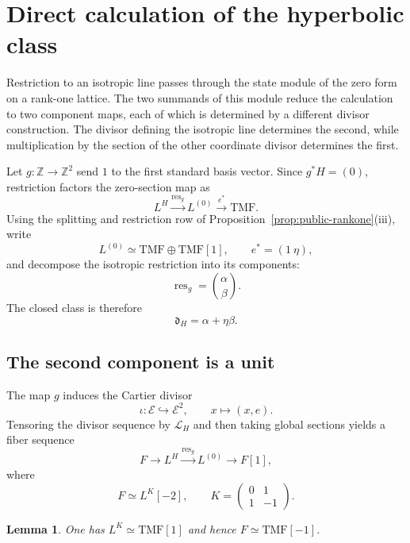 \documentclass[11pt,a4paper]{amsart}
\newcommand{\Z}{\mathbb Z}
\newcommand{\TMF}{\mathrm{TMF}}
\newcommand{\cE}{\mathcal E}
\newcommand{\cL}{\mathcal L}
\newcommand{\res}{\operatorname{res}}
\newcommand{\dclass}{\mathfrak d}
\theoremstyle{plain}
\newtheorem{lemma}[theorem]{Lemma}
\theoremstyle{definition}
\theoremstyle{remark}
\begin{document}
\section{Direct calculation of the hyperbolic class}\label{sec:H-class}

Restriction to an isotropic line passes through the state module
of the zero form on a rank-one lattice. The two summands of this
module reduce the calculation to two component maps, each of
which is determined by a different divisor construction. The
divisor defining the isotropic line determines the second,
while multiplication by the section of the other coordinate
divisor determines the first.

Let $g:\Z\to\Z^2$ send $1$ to the first standard basis vector.
Since $g^*H=(0)$, restriction factors the zero-section map as
\begin{equation}\label{eq:isotropic-factor}
 L^H\xrightarrow{\res_g}L^{(0)}\xrightarrow{e^*}\TMF.
\end{equation}
Using the splitting and restriction row of
Proposition~\ref{prop:public-rankone}(iii), write
\[
 L^{(0)}\simeq\TMF\oplus\TMF[1],
 \qquad
 e^*=(1\ \eta),
\]
and decompose the isotropic restriction into its components:
\begin{equation}\label{eq:alpha-beta}
 \res_g=\binom{\alpha}{\beta}.
\end{equation}
The closed class is therefore
\begin{equation}\label{eq:dH-alpha-beta}
 \dclass_H=\alpha+\eta\beta.
\end{equation}

\subsection{The second component is a unit}

The map $g$ induces the Cartier divisor
\[
 \iota:\cE\hookrightarrow\cE^2,
 \qquad
 x\longmapsto(x,e).
\]
Tensoring the divisor sequence by $\cL_H$ and then taking global
sections yields a fiber sequence
\begin{equation}\label{eq:beta-triangle}
 F\longrightarrow L^H\xrightarrow{\res_g}L^{(0)}\longrightarrow F[1],
\end{equation}
where
\[
 F\simeq L^K[-2],
 \qquad
 K=\begin{pmatrix}0&1\\1&-1\end{pmatrix}.
\]

\begin{lemma}\label{lem:K-shift}
One has $L^K\simeq\TMF[1]$ and hence $F\simeq\TMF[-1]$.
\end{lemma}
\end{document}
